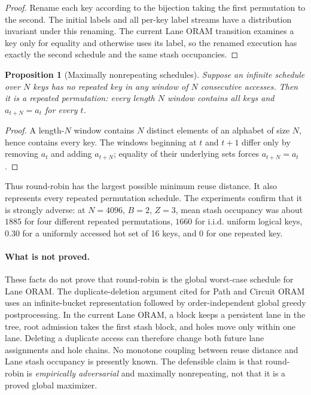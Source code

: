 \documentclass[11pt]{article}
\newtheorem{proposition}{Proposition}
\begin{document}
\begin{proof}
Rename each key according to the bijection taking the first permutation to the
second.  The initial labels and all per-key label streams have a distribution
invariant under this renaming.  The current Lane ORAM transition examines a
key only for equality and otherwise uses its label, so the renamed execution
has exactly the second schedule and the same stash occupancies.
\end{proof}

\begin{proposition}[Maximally nonrepeating schedules]
Suppose an infinite schedule over $N$ keys has no repeated key in any window of
$N$ consecutive accesses.  Then it is a repeated permutation: every length
$N$ window contains all keys and $a_{t+N}=a_t$ for every $t$.
\end{proposition}

\begin{proof}
A length-$N$ window contains $N$ distinct elements of an alphabet of size
$N$, hence contains every key.  The windows beginning at $t$ and $t+1$ differ
only by removing $a_t$ and adding $a_{t+N}$; equality of their underlying sets
forces $a_{t+N}=a_t$.
\end{proof}

Thus round-robin has the largest possible minimum reuse distance.  It also
represents every repeated permutation schedule.  The experiments confirm that
it is strongly adverse: at $N=4096$, $B=2$, $Z=3$, mean stash occupancy was
about $1885$ for four different repeated permutations, $1660$ for i.i.d.
uniform logical keys, $0.30$ for a uniformly accessed hot set of 16 keys, and
$0$ for one repeated key.

\paragraph{What is not proved.}
These facts do not prove that round-robin is the global worst-case schedule for
Lane ORAM.  The duplicate-deletion argument cited for Path and Circuit ORAM
uses an infinite-bucket representation followed by order-independent global
greedy postprocessing.  In the current Lane ORAM, a block keeps a persistent
lane in the tree, root admission takes the first stash block, and holes move
only within one lane.  Deleting a duplicate access can therefore change both
future lane assignments and hole chains.  No monotone coupling between reuse
distance and Lane stash occupancy is presently known.  The defensible claim is
that round-robin is \emph{empirically adversarial} and maximally nonrepeating,
not that it is a proved global maximizer.
\end{document}
